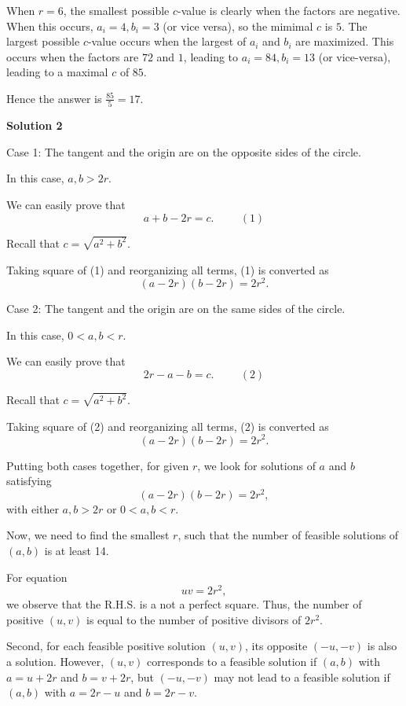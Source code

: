 \begin{enumerate}
 When $r=6$, the smallest possible $c$-value is clearly when the factors are negative. When this occurs, $a_i=4, b_i=3$ (or vice versa), so the mimimal $c$ is $5$. The largest possible $c$-value occurs when the largest of $a_i$ and $b_i$ are maximized. This occurs when the factors are $72$ and $1$, leading to $a_i=84, b_i=13$ (or vice-versa), leading to a maximal $c$ of $85$.

 Hence the answer is $\frac{85}5=\boxed{17}$.

 



\textbf{Solution 2}

Case 1: The tangent and the origin are on the opposite sides of the circle.

 In this case, $a, b > 2r$.

 We can easily prove that
 \[a + b - 2 r = c . \hspace{1cm} (1)\]

 Recall that $c = \sqrt{a^2 + b^2}$.

 Taking square of (1) and reorganizing all terms, (1) is converted as
 \[\left( a - 2 r \right) \left( b - 2 r \right) = 2 r^2 .\]

 
Case 2: The tangent and the origin are on the same sides of the circle.

 In this case, $0 < a, b < r$.

 We can easily prove that
 \[2 r - a - b  = c . \hspace{1cm} (2)\]

 Recall that $c = \sqrt{a^2 + b^2}$.

 Taking square of (2) and reorganizing all terms, (2) is converted as
 \[\left( a - 2 r \right) \left( b - 2 r \right) = 2 r^2 .\]

 Putting both cases together, for given $r$, we look for solutions of $a$ and $b$ satisfying
 \[\left( a - 2 r \right) \left( b - 2 r \right) = 2 r^2 ,\]with either $a, b > 2r$ or $0 < a, b < r$.

 Now, we need to find the smallest $r$, such that the number of feasible solutions of $(a, b)$ is at least 14.

 For equation
 \[uv = 2 r^2 ,\]we observe that the R.H.S. is a not a perfect square. Thus, the number of positive $(u, v)$ is equal to the number of positive divisors of $2 r^2$.

 Second, for each feasible positive solution $(u, v)$, its opposite $(-u, -v)$ is also a solution. However, $(u,v)$ corresponds to a feasible solution if $(a, b)$ with $a = u + 2r$ and $b = v + 2r$, but $(-u, -v)$ may not lead to a feasible solution if $(a, b)$ with $a = 2 r - u$ and $b = 2 r - v$.


\end{enumerate}
